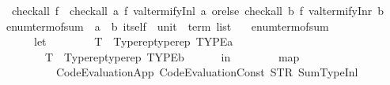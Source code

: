 \begin{isabellebody}
\isanewline
\isanewline
{}\isamarkupfalse%
\isanewline
\ \ {\isachardoublequoteopen}check{\isacharunderscore}{\kern0pt}all\ f\ {\isacharequal}{\kern0pt}\ check{\isacharunderscore}{\kern0pt}all\ {\isacharparenleft}{\kern0pt}{\isasymlambda}a{\isachardot}{\kern0pt}\ f\ {\isacharparenleft}{\kern0pt}valtermify{\isacharunderscore}{\kern0pt}Inl\ a{\isacharparenright}{\kern0pt}{\isacharparenright}{\kern0pt}\ orelse\ check{\isacharunderscore}{\kern0pt}all\ {\isacharparenleft}{\kern0pt}{\isasymlambda}b{\isachardot}{\kern0pt}\ f\ {\isacharparenleft}{\kern0pt}valtermify{\isacharunderscore}{\kern0pt}Inr\ b{\isacharparenright}{\kern0pt}{\isacharparenright}{\kern0pt}{\isachardoublequoteclose}\isanewline
\isanewline
{}\isamarkupfalse%
\ enum{\isacharunderscore}{\kern0pt}term{\isacharunderscore}{\kern0pt}of{\isacharunderscore}{\kern0pt}sum\ {\isacharcolon}{\kern0pt}{\isacharcolon}{\kern0pt}\ {\isachardoublequoteopen}{\isacharparenleft}{\kern0pt}{\isacharprime}{\kern0pt}a\ {\isacharplus}{\kern0pt}\ {\isacharprime}{\kern0pt}b{\isacharparenright}{\kern0pt}\ itself\ {\isasymRightarrow}\ unit\ {\isasymRightarrow}\ term\ list{\isachardoublequoteclose}\isanewline
\ \ \ {\isachardoublequoteopen}enum{\isacharunderscore}{\kern0pt}term{\isacharunderscore}{\kern0pt}of{\isacharunderscore}{\kern0pt}sum\ {\isacharequal}{\kern0pt}\isanewline
\ \ \ \ {\isacharparenleft}{\kern0pt}{\isasymlambda}{\isacharunderscore}{\kern0pt}\ {\isacharunderscore}{\kern0pt}{\isachardot}{\kern0pt}\isanewline
\ \ \ \ \ \ let\isanewline
\ \ \ \ \ \ \ \ T{}\ {\isacharequal}{\kern0pt}\ Typerep{\isachardot}{\kern0pt}typerep\ {\isacharparenleft}{\kern0pt}TYPE{\isacharparenleft}{\kern0pt}{\isacharprime}{\kern0pt}a{\isacharparenright}{\kern0pt}{\isacharparenright}{\kern0pt}{\isacharsemicolon}{\kern0pt}\isanewline
\ \ \ \ \ \ \ \ T{}\ {\isacharequal}{\kern0pt}\ Typerep{\isachardot}{\kern0pt}typerep\ {\isacharparenleft}{\kern0pt}TYPE{\isacharparenleft}{\kern0pt}{\isacharprime}{\kern0pt}b{\isacharparenright}{\kern0pt}{\isacharparenright}{\kern0pt}\isanewline
\ \ \ \ \ \ in\isanewline
\ \ \ \ \ \ \ \ map\isanewline
\ \ \ \ \ \ \ \ \ \ {\isacharparenleft}{\kern0pt}Code{\isacharunderscore}{\kern0pt}Evaluation{\isachardot}{\kern0pt}App\ {\isacharparenleft}{\kern0pt}Code{\isacharunderscore}{\kern0pt}Evaluation{\isachardot}{\kern0pt}Const\ {\isacharparenleft}{\kern0pt}STR\ {\isacharprime}{\kern0pt}{\isacharprime}{\kern0pt}Sum{\isacharunderscore}{\kern0pt}Type{\isachardot}{\kern0pt}Inl{\isacharprime}{\kern0pt}{\isacharprime}{\kern0pt}{\isacharparenright}{\kern0pt}\isanewline

\end{isabellebody}
